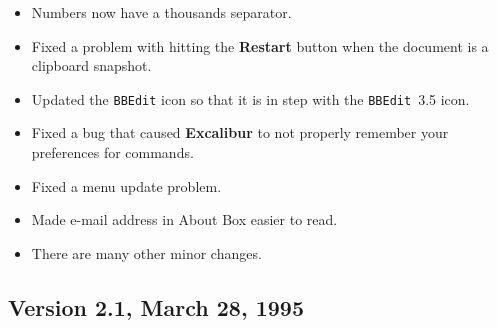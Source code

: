 ﻿\documentclass[11pt,titlepage]{article}
\newcommand{\ex}{\textbf{Excalibur}}
\begin{document}
\begin{itemize}
\item Numbers now have a thousands separator.

\item Fixed a problem with hitting the \textbf{Restart} button when
  the document is a clipboard snapshot.

\item Updated the \texttt{BBEdit} icon so that it is in step with the
  \texttt{BBEdit}~3.5 icon.

\item Fixed a bug that caused \ex{} to not properly remember your
  preferences for commands.

\item Fixed a menu update problem.

\item Made e-mail address in About Box easier to read.

\item There are many other minor changes.

\end{itemize}

\subsection{Version 2.1, March 28, 1995}
\end{document}
